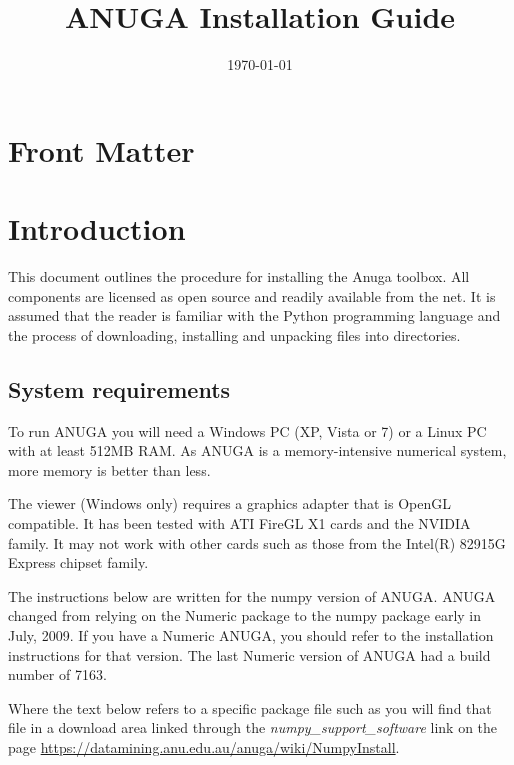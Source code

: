 \documentclass{manual}
\title{ANUGA Installation Guide}
\date{\today}                   %
\begin{document}
\maketitle



\ifhtml
\chapter*{Front Matter\label{front}}
\fi




\chapter{Introduction}

This document outlines the procedure for installing the Anuga toolbox.
All components are licensed as open source and readily available from the net.
It is assumed that the reader is familiar with the Python programming language
and the process of downloading, installing and unpacking files into directories.


\section{System requirements}
\label{sec:requirements}

To run ANUGA you will need a Windows PC (XP, Vista or 7) or a Linux PC with at 
least 512MB RAM.  As ANUGA is a memory-intensive numerical system, more memory is better than less.

The viewer (Windows only) requires a graphics adapter that
is OpenGL compatible. It has been tested with ATI FireGL X1 cards
and the NVIDIA family. It may not work with other cards such as those from the
Intel(R) 82915G Express chipset family.

The instructions below are written for the numpy version of ANUGA.  ANUGA changed from
relying on the Numeric package to the numpy package early in July, 2009.  If you have a Numeric ANUGA,
you should refer to the installation instructions for that version.  The last Numeric version of 
ANUGA had a build number of 7163.

Where the text below refers to a specific package file such as  you will find that
file in a download area linked through the \emph{numpy_support_software} link on the page
\url{https://datamining.anu.edu.au/anuga/wiki/NumpyInstall}.
\end{document}
